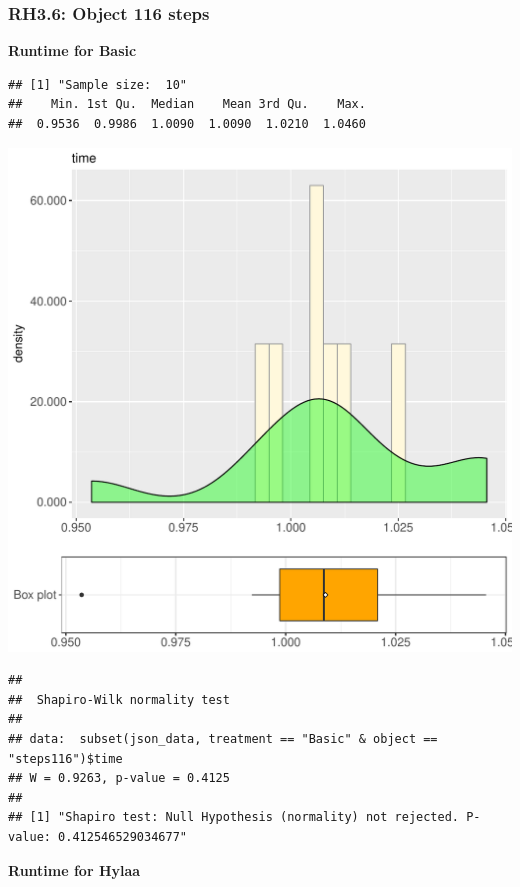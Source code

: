 \documentclass{article}\usepackage[]{graphicx}\usepackage[]{color}
\makeatletter
\def\maxwidth{ %
  \ifdim\Gin@nat@width>\linewidth
    \linewidth
  \else
    \Gin@nat@width
  \fi
}
\newenvironment{kframe}{%
 \def\at@end@of@kframe{}%
 \ifinner\ifhmode%
  \def\at@end@of@kframe{\end{minipage}}%
  \begin{minipage}{\columnwidth}%
 \fi\fi%
 \def\FrameCommand##1{\hskip\@totalleftmargin \hskip-\fboxsep
 \colorbox{shadecolor}{##1}\hskip-\fboxsep
     \hskip-\linewidth \hskip-\@totalleftmargin \hskip\columnwidth}%
 \MakeFramed {\advance\hsize-\width
   \@totalleftmargin\z@ \linewidth\hsize
   \@setminipage}}%
 {\par\unskip\endMakeFramed%
 \at@end@of@kframe}
\newenvironment{knitrout}{}{} %
\makeatother
\begin{document}
\subsubsection{RH3.6: Object 116 steps}

 \textbf{Runtime for Basic}
\begin{knitrout}
\color{fgcolor}\begin{kframe}
\begin{verbatim}
## [1] "Sample size:  10"
##    Min. 1st Qu.  Median    Mean 3rd Qu.    Max. 
##  0.9536  0.9986  1.0090  1.0090  1.0210  1.0460
\end{verbatim}
\end{kframe}
\includegraphics[width=\maxwidth]{figure/RH3_Basic_steps116-1} 
\begin{kframe}\begin{verbatim}
## 
## 	Shapiro-Wilk normality test
## 
## data:  subset(json_data, treatment == "Basic" & object == "steps116")$time
## W = 0.9263, p-value = 0.4125
## 
## [1] "Shapiro test: Null Hypothesis (normality) not rejected. P-value: 0.412546529034677"
\end{verbatim}
\end{kframe}
\end{knitrout}
 \textbf{Runtime for Hylaa}
\end{document}
